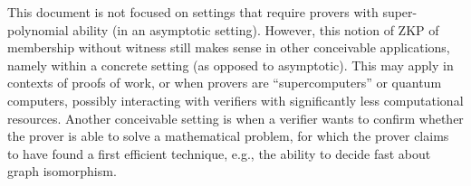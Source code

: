 	This document is not focused on settings that require provers with super-polynomial ability (in an asymptotic setting).
	However, this notion of ZKP of membership without witness still makes sense in other conceivable applications, namely within a concrete setting (as opposed to asymptotic).
	This may apply in contexts of proofs of work, or when provers are ``supercomputers''  or quantum computers, possibly interacting with verifiers with significantly less computational resources.
    Another conceivable setting is when a verifier wants to confirm whether the prover is able to solve a mathematical problem, for which the prover claims to have found a first efficient technique, e.g., the ability to decide fast about graph isomorphism.
 \loosen




